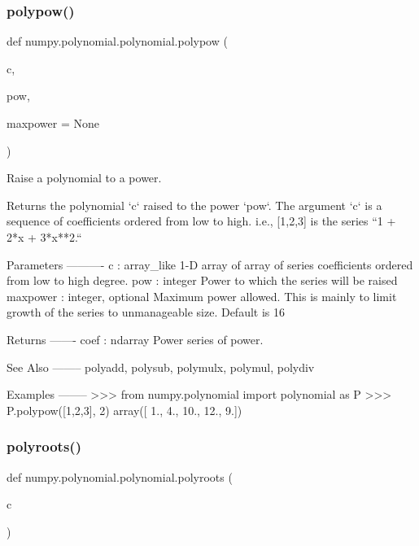 \subsubsection{\texorpdfstring{polypow()}{polypow()}}
{\footnotesize\ttfamily def numpy.\+polynomial.\+polynomial.\+polypow (\begin{DoxyParamCaption}\item[{}]{c,  }\item[{}]{pow,  }\item[{}]{maxpower = {\ttfamily None} }\end{DoxyParamCaption})}

\begin{DoxyVerb}Raise a polynomial to a power.

Returns the polynomial `c` raised to the power `pow`. The argument
`c` is a sequence of coefficients ordered from low to high. i.e.,
[1,2,3] is the series  ``1 + 2*x + 3*x**2.``

Parameters
----------
c : array_like
    1-D array of array of series coefficients ordered from low to
    high degree.
pow : integer
    Power to which the series will be raised
maxpower : integer, optional
    Maximum power allowed. This is mainly to limit growth of the series
    to unmanageable size. Default is 16

Returns
-------
coef : ndarray
    Power series of power.

See Also
--------
polyadd, polysub, polymulx, polymul, polydiv

Examples
--------
>>> from numpy.polynomial import polynomial as P
>>> P.polypow([1,2,3], 2)
array([ 1., 4., 10., 12., 9.])\end{DoxyVerb}
 \mbox{\label{namespacenumpy_1_1polynomial_1_1polynomial_ae72aeba038985daa535ad28ac6c578b9}} 
\subsubsection{\texorpdfstring{polyroots()}{polyroots()}}
{\footnotesize\ttfamily def numpy.\+polynomial.\+polynomial.\+polyroots (\begin{DoxyParamCaption}\item[{}]{c }\end{DoxyParamCaption})}

